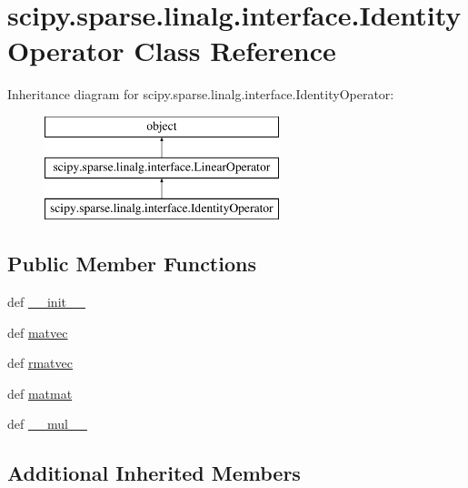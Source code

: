 \hypertarget{classscipy_1_1sparse_1_1linalg_1_1interface_1_1IdentityOperator}{}\section{scipy.\+sparse.\+linalg.\+interface.\+Identity\+Operator Class Reference}
\label{classscipy_1_1sparse_1_1linalg_1_1interface_1_1IdentityOperator}
Inheritance diagram for scipy.\+sparse.\+linalg.\+interface.\+Identity\+Operator\+:\begin{figure}[H]
\begin{center}
\leavevmode
\includegraphics[height=3.000000cm]{classscipy_1_1sparse_1_1linalg_1_1interface_1_1IdentityOperator}
\end{center}
\end{figure}
\subsection*{Public Member Functions}
\begin{DoxyCompactItemize}
\item 
def \hyperlink{classscipy_1_1sparse_1_1linalg_1_1interface_1_1IdentityOperator_a39d426dca0470e4884f80f08415ff508}{\+\_\+\+\_\+init\+\_\+\+\_\+}
\item 
def \hyperlink{classscipy_1_1sparse_1_1linalg_1_1interface_1_1IdentityOperator_a0b1b388d3219938139fe202b11df4a50}{matvec}
\item 
def \hyperlink{classscipy_1_1sparse_1_1linalg_1_1interface_1_1IdentityOperator_aab2bba365096b5745395ca7e9823b840}{rmatvec}
\item 
def \hyperlink{classscipy_1_1sparse_1_1linalg_1_1interface_1_1IdentityOperator_aa64a2bf4efa63960662013e5d837fb09}{matmat}
\item 
def \hyperlink{classscipy_1_1sparse_1_1linalg_1_1interface_1_1IdentityOperator_a1af6713ede72b4e3ff16f5033a896cd4}{\+\_\+\+\_\+mul\+\_\+\+\_\+}
\end{DoxyCompactItemize}
\subsection*{Additional Inherited Members}


